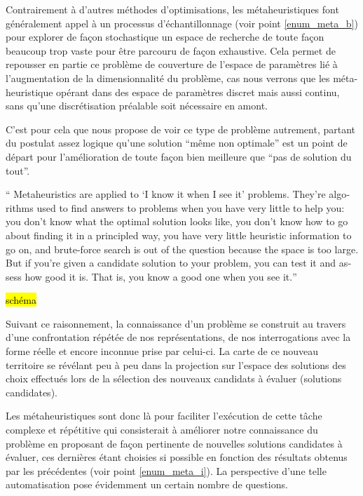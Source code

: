 Contrairement à d'autres méthodes d'optimisations, les métaheuristiques font généralement appel à un processus d'échantillonnage (voir point \ref{enum_meta_b}) pour explorer de façon stochastique un espace de recherche de toute façon beaucoup trop vaste pour être parcouru de façon exhaustive. Cela permet de repousser en partie ce problème de couverture de l'espace de paramètres lié à l'augmentation de la dimensionnalité du problème, cas nous verrons que les méta-heuristique opérant dans des espace de paramètres discret mais aussi continu, sans qu'une discrétisation préalable soit nécessaire en amont.

C'est pour cela que \textcite[7]{Luke2013} nous propose de voir ce type de problème autrement, partant du postulat assez logique qu'une solution \enquote{même non optimale} est un point de départ pour l'amélioration de toute façon bien meilleure que \enquote{pas de solution du tout}.

\foreignquote{english}{ Metaheuristics are applied to \enquote{I know it when I see it} problems. They're algorithms used to find answers to problems when you have very little to help you: you don't know what the optimal solution looks like, you don't know how to go about finding it in a principled way, you have very little heuristic information to go on, and brute-force search is out of the question because the space is too large. But if you're given a candidate solution to your problem, you can test it and assess how good it is. That is, you know a good one when you see it.}  

\hl{schéma}

Suivant ce raisonnement, la connaissance d'un problème se construit au travers d'une confrontation répétée de nos représentations, de nos interrogations avec la forme réelle et encore inconnue prise par celui-ci. La carte de ce nouveau territoire se révélant peu à peu dans la projection sur l'espace des solutions des choix effectués lors de la sélection des nouveaux candidats à évaluer (solutions candidates).

Les métaheuristiques sont donc là pour faciliter l'exécution de cette tâche complexe et répétitive qui consisterait à améliorer notre connaissance du problème en proposant de façon pertinente de nouvelles solutions candidates à évaluer, ces dernières étant choisies si possible en fonction des résultats obtenus par les précédentes (voir point \ref{enum_meta_i}). La perspective d'une telle automatisation pose évidemment un certain nombre de questions. 

